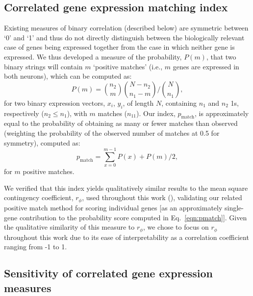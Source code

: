 \documentclass[10pt,letterpaper]{article}
\begin{document}
{\subsection*{Correlated gene expression matching index}
Existing measures of binary correlation (described below) are symmetric between `0' and `1' and thus do not directly distinguish between the biologically relevant case of genes being expressed together from the case in which neither gene is expressed.
We thus developed a measure of the probability, $P(m)$, that two binary strings will contain $m$ `positive matches' (i.e., $m$ genes are expressed in both neurons), which can be computed as:
\begin{equation} \label{eqn:positiveMatch}
    P(m) = \binom{n_2}{m} \binom{N-n_2}{n_1-m} / \binom{N}{n_1},
\end{equation}
for two binary expression vectors, $x_i$, $y_i$, of length $N$, containing $n_1$ and $n_2$ 1s, respectively ($n_2 \leq n_1$), with $m$ matches ($n_{11}$).
Our index, $p_\mathrm{match}$, is approximately equal to the probability of obtaining as many or fewer matches than observed (weighting the probability of the observed number of matches at 0.5 for symmetry), computed as:
\begin{equation} \label{eqn:pmatch}
     p_\mathrm{match} = \sum_{x=0}^{m-1} P(x) + P(m)/2,
\end{equation}
for $m$ positive matches.

We verified that this index yields qualitatively similar results to the mean square contingency coefficient, $r_\phi$, used throughout this work (), validating our related positive match method for scoring individual genes [as an approximately single-gene contribution to the probability score computed in Eq.~\eqref{eqn:pmatch}].
Given the qualitative similarity of this measure to $r_\phi$, we chose to focus on $r_\phi$ throughout this work due to its ease of interpretability as a correlation coefficient ranging from -1 to 1.

\subsection*{Sensitivity of correlated gene expression measures}

}
\end{document}
